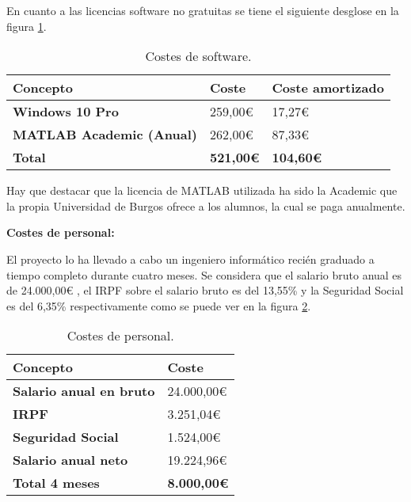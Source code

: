 En cuanto a las licencias software no gratuitas se tiene el siguiente desglose en la figura \ref{tabla:costes-de-software}.

\begin{table}[h!]
    \centering
    \begin{tabular}{l l l}
        \hline
        \textbf{Concepto}                   & \textbf{Coste}        & \textbf{Coste amortizado} \\
        \hline
        \textbf{Windows 10 Pro}             & 259,00€               & 17,27€                    \\
        \textbf{MATLAB Academic (Anual)}    & 262,00€               & 87,33€                    \\
        \hline
        \textbf{Total}                      & \textbf{521,00€}      & \textbf{104,60€}          \\
        \hline
    \end{tabular}
    \caption{Costes de software.}\label{tabla:costes-de-software}
\end{table}

Hay que destacar que la licencia de MATLAB utilizada ha sido la Academic que la propia Universidad de Burgos ofrece a los alumnos, la cual se paga anualmente.

\textbf{Costes de personal:}

El proyecto lo ha llevado a cabo un ingeniero informático recién graduado a tiempo completo durante cuatro meses. Se considera que el salario bruto anual es de 24.000,00€ \cite{sueldoIIespaña}, el IRPF sobre el salario bruto es del 13,55\% y la Seguridad Social es del 6,35\% respectivamente como se puede ver en la figura \ref{tabla:costes-de-personal}.

\begin{table}[h!]
    \centering
    \begin{tabular}{l l}
        \hline
        \textbf{Concepto}                   & \textbf{Coste}        \\
        \hline
        \textbf{Salario anual en bruto}     & 24.000,00€            \\
        \textbf{IRPF}                       & 3.251,04€             \\
        \textbf{Seguridad Social}           & 1.524,00€             \\
        \textbf{Salario anual neto}         & 19.224,96€            \\
        \hline
        \textbf{Total 4 meses}              & \textbf{8.000,00€}    \\
        \hline
    \end{tabular}
    \caption{Costes de personal.}\label{tabla:costes-de-personal}
\end{table}

